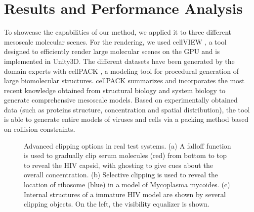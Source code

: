 \section{Results and Performance Analysis}

To showcase the capabilities of our method, we applied it to three different mesoscale molecular scenes. 
For the rendering, we used cellVIEW \cite{muzic15}, a tool designed to efficiently render large molecular scenes on the GPU and is implemented in Unity3D. 
The different datasets have been generated by the domain experts with cellPACK \cite{cellpack}, a modeling tool for procedural generation of large biomolecular structures.
cellPACK summarizes and incorporates the most recent knowledge obtained from structural biology and system biology to generate comprehensive mesoscale models. 
Based on experimentally obtained data (such as proteins structure, concentration and spatial distribution), the tool is able to generate entire models of viruses and cells via a packing method based on collision constraints.


\begin{figure}[t]
\centering
{}
\caption{\label{fig:res:res}
Advanced clipping options in real test systems. (a) A falloff function is used to gradually clip serum molecules (red) from bottom to top to reveal the HIV capsid, with ghosting to give cues about the overall concentration. (b) Selective clipping is used to reveal the location of ribosome (blue) in a model of Mycoplasma mycoides.
(c) Internal structures of a immature HIV model are shown by several clipping objects. On the left, the visibility equalizer is shown.}
\vspace{-3mm}
\end{figure}

